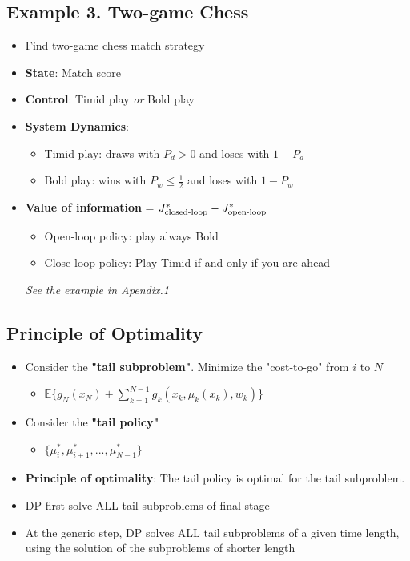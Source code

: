 \subsection{Example 3. Two-game Chess}
\begin{itemize}
    \item Find two-game chess match strategy
    \item \textbf{State}: Match score
    \item \textbf{Control}: Timid play \emph{or} Bold play
    \item \textbf{System Dynamics}:
        \begin{itemize}
            \item Timid play: draws with $P_d>0$ and loses with $1-P_d$
            \item Bold play: wins with $P_w\leq \frac{1}{2}$ and loses with $1-P_w$
        \end{itemize}
    \item \textbf{Value of information} = $J^*_{\textbf{\rm closed-loop}} - J^*_{\textbf{\rm open-loop}}$
        \begin{itemize}
            \item Open-loop policy: play always Bold
            \item Close-loop policy: Play Timid if and only if you are ahead
        \end{itemize}
    \emph{See the example in Apendix.1}
\end{itemize}

\subsection{Principle of Optimality}
\begin{itemize}
    \item Consider the \textbf{"tail subproblem"}. Minimize the "cost-to-go" from $i$ to $N$
        \begin{itemize}
            \item $\mathbb{E}\{g_N(x_N)+\sum_{k=1}^{N-1}g_k(x_k,\mu_k(x_k),w_k)\}$
        \end{itemize} 
    \item Consider the \textbf{"tail policy"}
        \begin{itemize}
            \item $\{\mu_i^*,\mu_{i+1}^*,...,\mu_{N-1}^*\}$
        \end{itemize} 
    \item \textbf{Principle of optimality}: The tail policy is optimal for the tail subproblem.
    \item DP first solve ALL tail subproblems of final stage
    \item At the generic step, DP solves ALL tail subproblems of a given time length, using the solution of the subproblems of shorter length
\end{itemize}

